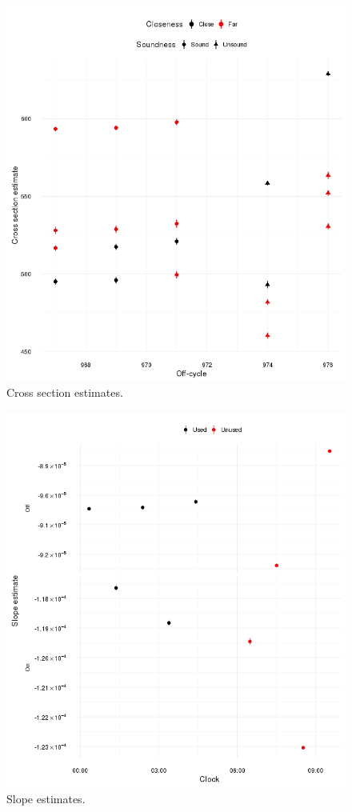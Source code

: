 \documentclass[reprint]{revtex4-1}
\newcommand{\scl}{.39}
\begin{document}
\begin{figure}
\includegraphics[scale=\scl]{../img/Cross-Section_all}
\caption{Cross section estimates.\label{fig:CS-all}}
\end{figure}%
\begin{figure}
\includegraphics[scale=\scl]{../img/Slopes-2012_big}
\caption{Slope estimates.\label{fig:Slopes}}
\end{figure}
\end{document}
